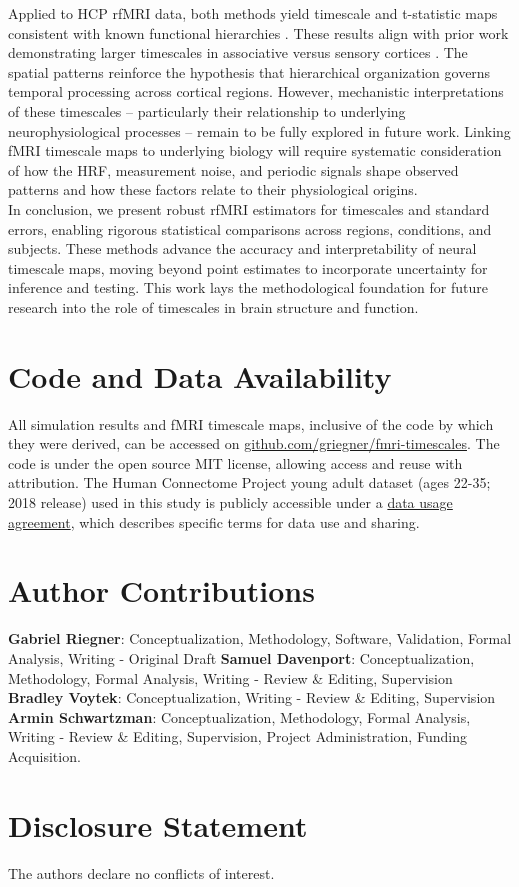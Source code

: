\documentclass[9pt]{article}
\begin{document}
Applied to HCP rfMRI data, both methods yield timescale and t-statistic maps consistent with known functional hierarchies \citep{van_essen_wu-minn_2013}. These results align with prior work demonstrating larger timescales in associative versus sensory cortices \citep{raut_hierarchical_2020, shafiei_topographic_2020, lurie_cortical_2024, mitra_lag_2014, kaneoke_variance_2012, wengler_distinct_2020, shinn_functional_2023, manea_intrinsic_2022, ito_cortical_2020, muller_core_2020}. The spatial patterns reinforce the hypothesis that hierarchical organization governs temporal processing across cortical regions. However, mechanistic interpretations of these timescales -- particularly their relationship to underlying neurophysiological processes -- remain to be fully explored in future work. Linking fMRI timescale maps to underlying biology will require systematic consideration of how the HRF, measurement noise, and periodic signals shape observed patterns and how these factors relate to their physiological origins.\\

In conclusion, we present robust rfMRI estimators for timescales and standard errors, enabling rigorous statistical comparisons across regions, conditions, and subjects. These methods advance the accuracy and interpretability of neural timescale maps, moving beyond point estimates to incorporate uncertainty for inference and testing. This work lays the methodological foundation for future research into the role of timescales in brain structure and function.

\section*{Code and Data Availability}
All simulation results and fMRI timescale maps, inclusive of the code by which they were derived, can be accessed on \href{https://github.com/griegner/fmri-timescales}{github.com/griegner/fmri-timescales}. The code is under the open source MIT license, allowing access and reuse with attribution. The Human Connectome Project young adult dataset (ages 22-35; 2018 release) used in this study is publicly accessible under a \href{https://www.humanconnectome.org/storage/app/media/data_use_terms/DataUseTerms-HCP-Open-Access-26Apr2013.pdf}{data usage agreement}, which describes specific terms for data use and sharing.

\section*{Author Contributions}
\textbf{Gabriel Riegner}: Conceptualization, Methodology, Software, Validation, Formal Analysis, Writing - Original Draft
\textbf{Samuel Davenport}: Conceptualization, Methodology, Formal Analysis, Writing - Review \& Editing, Supervision
\textbf{Bradley Voytek}: Conceptualization, Writing - Review \& Editing, Supervision
\textbf{Armin Schwartzman}: Conceptualization, Methodology, Formal Analysis, Writing - Review \& Editing, Supervision, Project Administration, Funding Acquisition.

\section*{Disclosure Statement}
The authors declare no conflicts of interest.

\bigskip

\end{document}
